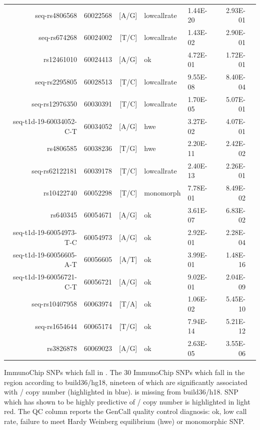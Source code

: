 \begin{table}[h]
\begin{center}
\begin{tabular}{rlrllrr}
\rowcolor{LightCyan}
seq-rs4806568           & 60022568 & [A/G] & lowcallrate & 1.44E-20 & 2.93E-01 \\
seq-rs674268            & 60024002 & [T/C] & lowcallrate & 1.43E-02 & 2.90E-01 \\
rs12461010              & 60024413 & [A/G] & ok          & 4.72E-01 & 1.72E-01 \\
\rowcolor{LightCyan}
seq-rs2295805           & 60028513 & [T/C] & lowcallrate & 9.55E-08 & 8.40E-04 \\
seq-rs12976350          & 60030391 & [T/C] & lowcallrate & 1.70E-05 & 5.07E-01 \\
seq-t1d-19-60034052-C-T & 60034052 & [A/G] & hwe         & 3.27E-02 & 4.07E-01 \\
\rowcolor{LightCyan}
rs4806585               & 60038236 & [T/G] & hwe         & 2.20E-11 & 2.42E-02 \\
\rowcolor{LightCyan}
seq-rs62122181          & 60039178 & [T/C] & lowcallrate & 2.40E-13 & 2.26E-01 \\
rs10422740              & 60052298 & [T/C] & monomorph   & 7.78E-01 & 8.49E-02 \\
\rowcolor{LightCyan}
rs640345                & 60054671 & [A/G] & ok          & 3.61E-07 & 6.83E-02 \\
seq-t1d-19-60054973-T-C & 60054973 & [A/G] & ok          & 2.92E-01 & 2.28E-04 \\
\rowcolor{LightCyan}
seq-t1d-19-60056605-A-T & 60056605 & [A/T] & ok          & 3.99E-01 & 1.48E-16 \\
\rowcolor{LightCyan}
seq-t1d-19-60056721-C-T & 60056721 & [A/G] & ok          & 9.02E-01 & 2.04E-09 \\
\rowcolor{LightCyan}
seq-rs10407958          & 60063974 & [T/A] & ok          & 1.06E-02 & 5.45E-10 \\
\rowcolor{LightCyan}
seq-rs1654644           & 60065174 & [T/G] & ok          & 7.94E-14 & 5.21E-12 \\
\rowcolor{LightCyan}
rs3826878               & 60069023 & [A/G] & ok          & 2.63E-05 & 3.55E-06 \\
   \hline
\end{tabular}
\end{center}
    {ImmunoChip SNPs which fall in .}
    {
    The 30 ImmunoChip SNPs which fall in the  region according to build36/hg18, nineteen of which
    are significantly associated with / copy number (highlighted in blue).
     is missing from build36/h18.
    SNP  which has shown to be highly predictive of / copy number is
    highlighted in light red.
    The QC column reports the GenCall quality control diagnosis: ok, low call rate, failure to meet Hardy Weinberg equilibrium (hwe) or
    monomorphic SNP.
    }
\end{table}


